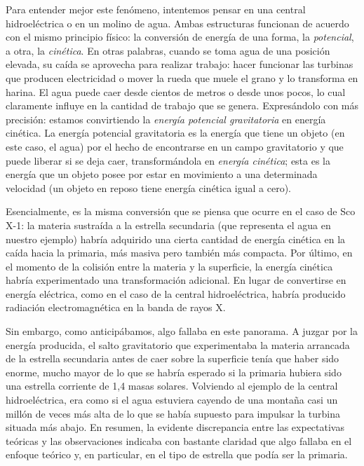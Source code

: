 Para entender mejor este fenómeno, intentemos pensar en una central hidroeléctrica o en un molino de agua. Ambas estructuras funcionan de acuerdo con el mismo principio físico: la conversión de energía de una forma, la \emph{potencial}, a otra, la \emph{cinética}. En otras palabras, cuando se toma agua de una posición elevada, su caída se aprovecha para realizar trabajo: hacer funcionar las turbinas que producen electricidad o mover la rueda que muele el grano y lo transforma en harina. El agua puede caer desde cientos de metros o desde unos pocos, lo cual claramente influye en la cantidad de trabajo que se genera. Expresándolo con más precisión: estamos convirtiendo la \emph{energía potencial gravitatoria} en energía cinética. La energía potencial gravitatoria es la energía que tiene un objeto (en este caso, el agua) por el hecho de encontrarse en un campo gravitatorio y que puede liberar si se deja caer, transformándola en \emph{energía cinética}; esta es la energía que un objeto posee por estar en movimiento a una determinada velocidad (un objeto en reposo tiene energía cinética igual a cero).

Esencialmente, es la misma conversión que se piensa que ocurre en el caso de Sco X-1: la materia sustraída a la estrella secundaria (que representa el agua en nuestro ejemplo) habría adquirido una cierta cantidad de energía cinética en la caída hacia la primaria, más masiva pero también más compacta. Por último, en el momento de la colisión entre la materia y la superficie, la energía cinética habría experimentado una transformación adicional. En lugar de convertirse en energía eléctrica, como en el caso de la central hidroeléctrica, habría producido radiación electromagnética en la banda de rayos X.

Sin embargo, como anticipábamos, algo fallaba en este panorama. A juzgar por la energía producida, el salto gravitatorio que experimentaba la materia arrancada de la estrella secundaria antes de caer sobre la superficie tenía que haber sido enorme, mucho mayor de lo que se habría esperado si la primaria hubiera sido una estrella corriente de 1,4 masas solares. Volviendo al ejemplo de la central hidroeléctrica, era como si el agua estuviera cayendo de una montaña casi un millón de veces más alta de lo que se había supuesto para impulsar la turbina situada más abajo. En resumen, la evidente discrepancia entre las expectativas teóricas y las observaciones indicaba con bastante claridad que algo fallaba en el enfoque teórico y, en particular, en el tipo de estrella que podía ser la primaria.

